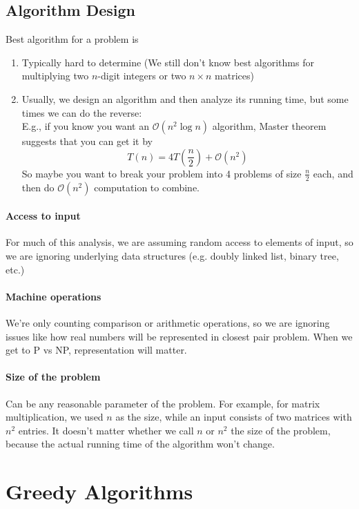 \documentclass[11pt]{article}
\begin{document}
\subsection{Algorithm Design}
Best algorithm for a problem is
\begin{enumerate}
	\item Typically hard to determine (We still don't know best algorithms for multiplying two $n$-digit integers or two $n \times n$ matrices)
	\item Usually, we design an algorithm and then analyze its running time, but some times we can do the reverse: \\
	E.g., if you know you want an $\mathcal{O}(n^2 \log n)$ algorithm, Master theorem suggests that you can get it by
	$$T(n) = 4T(\frac{n}{2}) + \mathcal{O}(n^2)$$
	So maybe you want to break your problem into 4 problems of size $\frac{n}{2}$ each, and then do $\mathcal{O}(n^2)$ computation to combine.
\end{enumerate}

\paragraph{Access to input}
For much of this analysis, we are assuming random access to elements of input, so we are ignoring underlying data structures (e.g. doubly linked list, binary tree, etc.)

\paragraph{Machine operations}
We're only counting comparison or arithmetic operations, so we are ignoring issues like how real numbers will be represented in closest pair problem. When we get to P vs NP, representation will matter.
\paragraph{Size of the problem}
Can be any reasonable parameter of the problem. For example, for matrix multiplication, we used $n$ as the size, while an input consists of two matrices with $n^2$ entries. It doesn't matter whether we call $n$ or $n^2$ the size of the problem, because the actual running time of the algorithm won't change.

\section{Greedy Algorithms}
\end{document}
